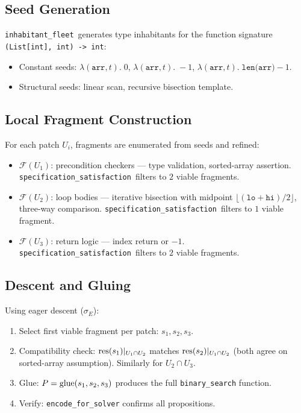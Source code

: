 \documentclass[11pt]{article}
\newcommand{\FragmentSpace}{\mathcal{F}}
\newcommand{\SpecSat}{\texttt{specification\_satisfaction}}
\newcommand{\InhabFleet}{\texttt{inhabitant\_fleet}}
\begin{document}
\subsection{Seed Generation}

\InhabFleet\ generates type inhabitants for the function signature
\texttt{(List[int], int) -> int}:
\begin{itemize}[noitemsep]
  \item Constant seeds: $\lambda (\texttt{arr}, t).\; 0$,
        $\lambda (\texttt{arr}, t).\; -1$,
        $\lambda (\texttt{arr}, t).\; \texttt{len(arr)} - 1$.
  \item Structural seeds: linear scan, recursive bisection template.
\end{itemize}

\subsection{Local Fragment Construction}

For each patch $U_i$, fragments are enumerated from seeds and refined:
\begin{itemize}[noitemsep]
  \item $\FragmentSpace(U_1)$: precondition checkers --- type validation,
        sorted-array assertion.  \SpecSat\ filters to $2$ viable fragments.
  \item $\FragmentSpace(U_2)$: loop bodies --- iterative bisection with
        midpoint $\lfloor (\texttt{lo} + \texttt{hi}) / 2 \rfloor$,
        three-way comparison.  \SpecSat\ filters to $1$ viable fragment.
  \item $\FragmentSpace(U_3)$: return logic --- index return or $-1$.
        \SpecSat\ filters to $2$ viable fragments.
\end{itemize}

\subsection{Descent and Gluing}

Using eager descent ($\sigma_E$):
\begin{enumerate}[noitemsep]
  \item Select first viable fragment per patch: $s_1, s_2, s_3$.
  \item Compatibility check: $\mathrm{res}(s_1)|_{U_1 \cap U_2}$ matches
        $\mathrm{res}(s_2)|_{U_1 \cap U_2}$ (both agree on sorted-array
        assumption).  Similarly for $U_2 \cap U_3$.
  \item Glue: $P = \mathrm{glue}(s_1, s_2, s_3)$ produces the full
        \texttt{binary\_search} function.
  \item Verify: \texttt{encode\_for\_solver} confirms all propositions.
\end{enumerate}
\end{document}
